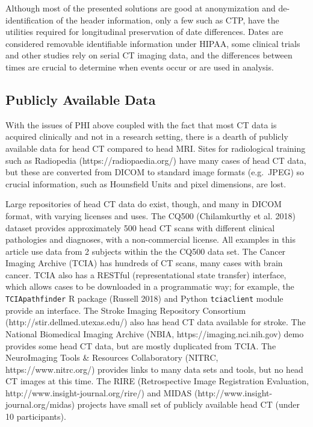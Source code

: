 \documentclass[]{elsarticle} %
\begin{document}
Although most of the presented solutions are good at anonymization and de-identification of the header information, only a few such as CTP, have the utilities required for longitudinal preservation of date differences. Dates are considered removable identifiable information under HIPAA, some clinical trials and other studies rely on serial CT imaging data, and the differences between times are crucial to determine when events occur or are used in analysis.

\hypertarget{publicly-available-data}{%
\subsection{Publicly Available Data}\label{publicly-available-data}}

With the issues of PHI above coupled with the fact that most CT data is acquired clinically and not in a research setting, there is a dearth of publicly available data for head CT compared to head MRI. Sites for radiological training such as Radiopedia (https://radiopaedia.org/) have many cases of head CT data, but these are converted from DICOM to standard image formats (e.g.~JPEG) so crucial information, such as Hounsfield Units and pixel dimensions, are lost.

Large repositories of head CT data do exist, though, and many in DICOM format, with varying licenses and uses. The CQ500 (Chilamkurthy et al. 2018) dataset provides approximately 500 head CT scans with different clinical pathologies and diagnoses, with a non-commercial license. All examples in this article use data from 2 subjects within the the CQ500 data set. The Cancer Imaging Archive (TCIA) has hundreds of CT scans, many cases with brain cancer. TCIA also has a RESTful (representational state transfer) interface, which allows cases to be downloaded in a programmatic way; for example, the \texttt{TCIApathfinder} R package (Russell 2018) and Python \texttt{tciaclient} module provide an interface. The Stroke Imaging Repository Consortium (http://stir.dellmed.utexas.edu/) also has head CT data available for stroke. The National Biomedical Imaging Archive (NBIA, https://imaging.nci.nih.gov) demo provides some head CT data, but are mostly duplicated from TCIA. The NeuroImaging Tools \& Resources Collaboratory (NITRC, https://www.nitrc.org/) provides links to many data sets and tools, but no head CT images at this time. The RIRE (Retrospective Image Registration Evaluation, http://www.insight-journal.org/rire/) and MIDAS (http://www.insight-journal.org/midas) projects have small set of publicly available head CT (under 10 participants).
\end{document}
